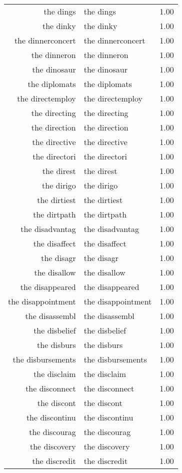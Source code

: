 \begin{table}[ht]
\begin{tabular}{rlr}
  the dings & the dings & 1.00 \\ 
  the dinky & the dinky & 1.00 \\ 
  the dinnerconcert & the dinnerconcert & 1.00 \\ 
  the dinneron & the dinneron & 1.00 \\ 
  the dinosaur & the dinosaur & 1.00 \\ 
  the diplomats & the diplomats & 1.00 \\ 
  the directemploy & the directemploy & 1.00 \\ 
  the directing & the directing & 1.00 \\ 
  the direction & the direction & 1.00 \\ 
  the directive & the directive & 1.00 \\ 
  the directori & the directori & 1.00 \\ 
  the direst & the direst & 1.00 \\ 
  the dirigo & the dirigo & 1.00 \\ 
  the dirtiest & the dirtiest & 1.00 \\ 
  the dirtpath & the dirtpath & 1.00 \\ 
  the disadvantag & the disadvantag & 1.00 \\ 
  the disaffect & the disaffect & 1.00 \\ 
  the disagr & the disagr & 1.00 \\ 
  the disallow & the disallow & 1.00 \\ 
  the disappeared & the disappeared & 1.00 \\ 
  the disappointment & the disappointment & 1.00 \\ 
  the disassembl & the disassembl & 1.00 \\ 
  the disbelief & the disbelief & 1.00 \\ 
  the disburs & the disburs & 1.00 \\ 
  the disbursements & the disbursements & 1.00 \\ 
  the disclaim & the disclaim & 1.00 \\ 
  the disconnect & the disconnect & 1.00 \\ 
  the discont & the discont & 1.00 \\ 
  the discontinu & the discontinu & 1.00 \\ 
  the discourag & the discourag & 1.00 \\ 
  the discovery & the discovery & 1.00 \\ 
  the discredit & the discredit & 1.00 \\ 

\end{tabular}
\end{table}
